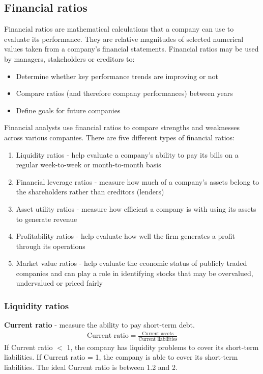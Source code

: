 \subsection{Financial ratios}
Financial ratios are mathematical calculations that a company can use to evaluate its performance. They are relative magnitudes of selected numerical values taken from a company's financial statements. Financial ratios may be used by managers, stakeholders or creditors to:
\begin{itemize}
    \item Determine whether key performance trends are improving or not
    \item Compare ratios (and therefore company performances) between years
    \item Define goals for future companies
\end{itemize}
Financial analysts use financial ratios to compare strengths and weaknesses across various companies. There are five different types of financial ratios:
\begin{enumerate}
    \item Liquidity ratios - help evaluate a company's ability to pay its bills on a regular week-to-week or month-to-month basis
    \item Financial leverage ratios - measure how much of a company's assets belong to the shareholders rather than creditors (lenders)
    \item Asset utility ratios - measure how efficient a company is with using its assets to generate revenue
    \item Profitability ratios - help evaluate how well the firm generates a profit through its operations
    \item Market value ratios - help evaluate the economic status of publicly traded companies and can play a role in identifying stocks that may be overvalued, undervalued or priced fairly
\end{enumerate}
\subsubsection{Liquidity ratios}
\textbf{Current ratio} - measure the ability to pay short-term debt. 
\begin{gather}
    \textrm{Current ratio} = \frac{\textrm{Current assets}}{\textrm{Current liabilities}}
\end{gather}
If Current ratio $<$ 1, the company has liquidity problems to cover its short-term liabilities. If Current ratio = 1, the company is able to cover its short-term liabilities. The ideal Current ratio is between 1.2 and 2.

